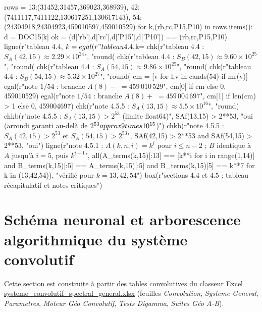 \documentclass[11pt,a4paper]{article}
\begin{document}
\begin{pycode}
rows = {13:(31452,31457,369023,368939), 42:(7411117,7411122,130617251,130617143), 54:(24304918,24304923,459010597,459010529)}
for k,(rb,rc,P15,P10) in rows.items():
    d = DOC15[k]
    ok = (d['rb'],d['rc'],d['P15'],d['P10']) == (rb,rc,P15,P10)
    ligne(r"tableau 4.4, $k=%
    egal(r"tableau 4.4, $k=%
chk(r"tableau 4.4 : $S_A(42,15)\approx2.29\times10^{24}$", "round(%
chk(r"tableau 4.4 : $S_B(42,15)\approx9.60\times10^{25}$", "round(%
chk(r"tableau 4.4 : $S_A(54,15)\approx9.86\times10^{25}$", "round(%
chk(r"tableau 4.4 : $S_B(54,15)\approx5.32\times10^{27}$", "round(%
cm = [v for l,v in cands(54) if mr(v)]
egal(r"note $1/54$ : branche $A(8)-$ $=459\,010\,529$", cm[0] if cm else 0, 459010529)
egal(r"note $1/54$ : branche $A(8)+$ $=459\,004\,697$", cm[1] if len(cm) > 1 else 0, 459004697)
chk(r"note 4.5.5 : $S_A(13,15)\approx5.5\times10^{16}$", "round(%
chkb(r"note 4.5.5 : $S_A(13,15)>2^{53}$ (limite float64)", SAf(13,15) > 2**53, "oui (arrondi garanti au-delà de $2^{53}\\approx9\\times10^{15}$)")
chkb(r"note 4.5.5 : $S_A(42,15)>2^{53}$ et $S_A(54,15)>2^{53}$", SAf(42,15) > 2**53 and SAf(54,15) > 2**53, "oui")
ligne(r"note 4.5.1 : $A(k,n,i)=k^{i}$ pour $i\le n-2$ ; $B$ identique à $A$ jusqu'à $i=5$, puis $k^{i+1}$", all(A_terms(k,15)[:13] == [k**i for i in range(1,14)] and B_terms(k,15)[:5] == A_terms(k,15)[:5] and B_terms(k,15)[5] == k**7 for k in (13,42,54)), "vérifié pour $k=13,42,54$")
box(r"sections 4.4 et 4.5 : tableau récapitulatif et notes critiques")
\end{pycode}

\section{Schéma neuronal et arborescence algorithmique du système convolutif}

Cette section est construite à partir des tables convolutives du classeur Excel
\url{systeme_convolutif_spectral_general.xlsx} (feuilles
\emph{Convolution}, \emph{Systeme General}, \emph{Parametres},
\emph{Moteur Géo Convolutif}, \emph{Tests Digamma}, \emph{Suites Géo A-B}).
\end{document}
